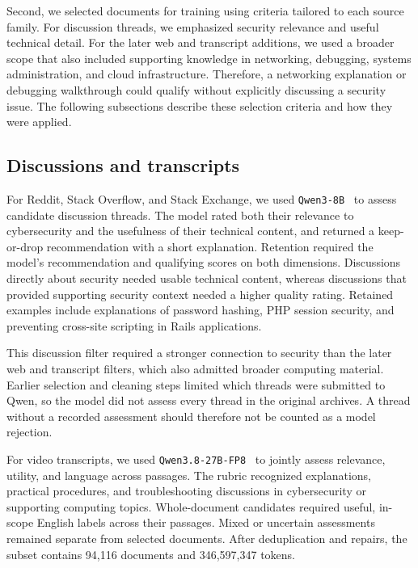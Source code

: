 \documentclass[10pt,twocolumn]{article}
\begin{document}
Second, we selected documents for training using criteria tailored to each source family. For discussion threads, we emphasized security relevance and useful technical detail. For the later web and transcript additions, we used a broader scope that also included supporting knowledge in networking, debugging, systems administration, and cloud infrastructure. Therefore, a networking explanation or debugging walkthrough could qualify without explicitly discussing a security issue. The following subsections describe these selection criteria and how they were applied.

\subsection{Discussions and transcripts}

For Reddit, Stack Overflow, and Stack Exchange, we used
\texttt{Qwen3-8B}~\cite{qwen3} to assess candidate
discussion threads. The model rated both their relevance to cybersecurity
and the usefulness of their technical content, and returned a keep-or-drop
recommendation with a short explanation. Retention required the model's
recommendation and qualifying scores on both dimensions. Discussions directly
about security needed usable technical content, whereas discussions that provided
supporting security context needed a higher quality rating. Retained examples
include explanations of password hashing, PHP session security, and preventing
cross-site scripting in Rails applications.

This discussion filter required a stronger connection to security than the
later web and transcript filters, which also admitted broader computing
material. Earlier selection and cleaning steps limited which threads were
submitted to Qwen, so the model did not assess every thread in the original
archives. A thread without a recorded assessment should therefore not be
counted as a model rejection.

For video transcripts, we used \texttt{Qwen3.8-27B-FP8}~\cite{qwen38} to jointly assess
relevance, utility, and language across passages. The rubric recognized
explanations, practical procedures, and troubleshooting discussions in
cybersecurity or supporting computing topics. Whole-document candidates
required useful, in-scope English labels across their passages. Mixed or
uncertain assessments remained separate from selected documents. After deduplication and repairs, the subset contains 94,116
documents and 346,597,347 tokens.
\end{document}
